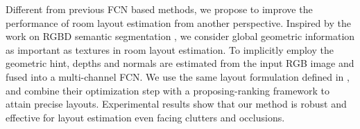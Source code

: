 Different from previous FCN based methods, we propose to improve the performance of room layout estimation from another perspective. 
Inspired by the work on RGBD semantic segmentation \cite{gupta2014learning,couprie2013indoor,li2017semantics,pagnutti2017segmentation,qi20173d}, we consider global geometric information as important as textures in room layout estimation. 
To implicitly employ the geometric hint, depths and normals are estimated from the input RGB image and fused into a multi-channel FCN. We use the same layout formulation defined in \cite{dasgupta2016delay}, and combine their optimization step with a proposing-ranking framework to attain precise layouts. 
Experimental results show that our method is robust and effective for layout estimation even facing clutters and occlusions.
 





